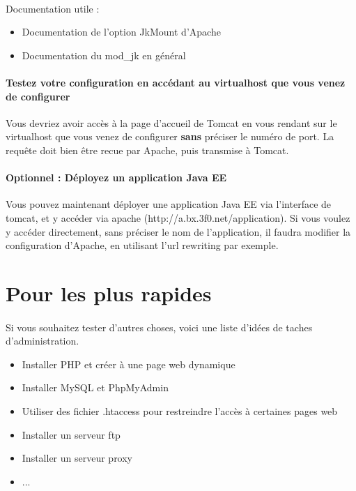\documentclass[12pt,a4paper]{article}
\begin{document}
\paragraph{}
Documentation utile : 
\begin{itemize}
\item Documentation de l'option JkMount d'Apache
\item Documentation du mod\_jk en général
\end{itemize}

\paragraph{Testez votre configuration en accédant au virtualhost que vous venez de configurer\\}
Vous devriez avoir accès à la page d'accueil de Tomcat en vous rendant sur le virtualhost que vous venez de configurer \textbf{sans} préciser le numéro de port. La requête doit bien être recue par Apache, puis transmise à Tomcat.

\paragraph{Optionnel : Déployez un application Java EE\\}
Vous pouvez maintenant déployer une application Java EE via l'interface de tomcat, et y accéder via apache (http://a.bx.3f0.net/application). Si vous voulez y accéder directement, sans préciser le nom de l'application, il faudra modifier la configuration d'Apache, en utilisant l'url rewriting par exemple.

\section{Pour les plus rapides}

\paragraph{}
Si vous souhaitez tester d'autres choses, voici une liste d'idées de taches d'administration.
\begin{itemize}
\item Installer PHP et créer à une page web dynamique
\item Installer MySQL et PhpMyAdmin
\item Utiliser des fichier .htaccess pour restreindre l'accès à certaines pages web
\item Installer un serveur ftp
\item Installer un serveur proxy
\item ...
\end{itemize}
\end{document}
